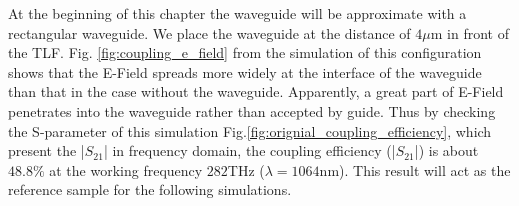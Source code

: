 At the beginning of this chapter the waveguide will be approximate with a rectangular waveguide. We place the waveguide at the distance of $4\mu$m in front of the TLF.  Fig. \ref{fig:coupling_e_field} from the simulation of this configuration shows that the E-Field spreads more widely at the interface of the waveguide than that in the case without the waveguide. Apparently, a great part of E-Field penetrates into the waveguide rather than accepted by guide. Thus by checking the S-parameter of this simulation Fig.\ref{fig:orignial_coupling_efficiency}, which present the |$S_{21}$| in frequency domain, the coupling efficiency (|$S_{21}$|) is about $48.8\%$ at the working frequency $282$THz ($\lambda=1064$nm). This result will act as the reference sample for the following simulations.\\ 

